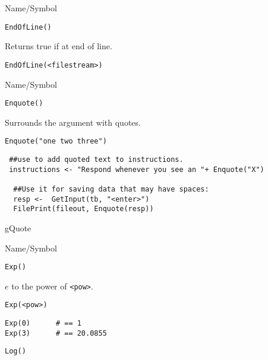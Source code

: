 \begin{desc}{Name/Symbol}
\item[Name/Symbol]	\verb+EndOfLine()+

\item[Description]	Returns true if at end of line.

\item[Usage]
\begin{verbatim}
EndOfLine(<filestream>)
\end{verbatim}

\item[Example]	

\item[See Also]	
\end{desc}

\rl


\begin{desc}{Name/Symbol}
\item[Name/Symbol]	\verb+Enquote()+

\item[Description]	Surrounds the argument with quotes.  

\item[Usage]
\begin{verbatim}
Enquote("one two three")
\end{verbatim}

\item[Example]
\begin{verbatim}
 ##use to add quoted text to instructions.
 instructions <- "Respond whenever you see an "+ Enquote("X")

  ##Use it for saving data that may have spaces: 
  resp <-  GetInput(tb, "<enter>")
  FilePrint(fileout, Enquote(resp))

\end{verbatim}

\item[See Also]	
 gQuote 
\end{desc}

\rl






\begin{desc}{Name/Symbol}
\item[Name/Symbol]  	\verb+Exp()+

\item[Description]	$e$ to the power of \verb+<pow>+.

\item[Usage]
\begin{verbatim}
Exp(<pow>)
\end{verbatim}

\item[Example]
\begin{verbatim}
Exp(0) 		# == 1
Exp(3)		# == 20.0855
\end{verbatim}

\item[See Also]	\verb+Log()+
\end{desc}

